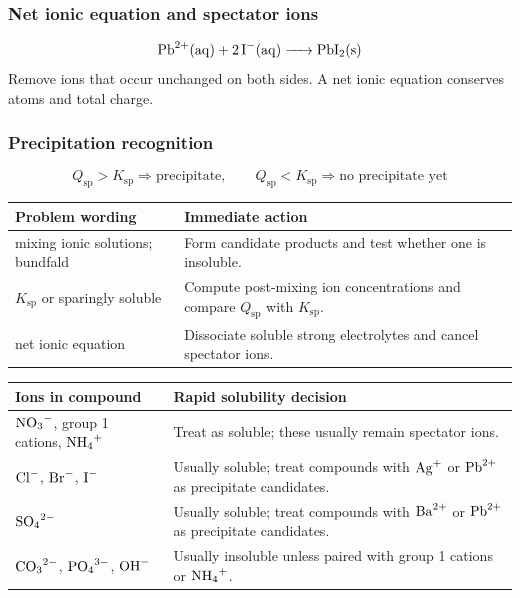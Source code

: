 \subsubsection{Net ionic equation and spectator ions}
\begin{equation}\label{eq:aqueous:net-ionic-example}
\ce{Pb^2+(aq) + 2I-(aq) -> PbI2(s)}
\end{equation}
Remove ions that occur unchanged on both sides. A net ionic equation conserves atoms and total charge.

\subsubsection{Precipitation recognition}
\begin{equation}\label{eq:aqueous:precipitation-test}
Q_{\mathrm{sp}}>K_{\mathrm{sp}}\Rightarrow\text{precipitate}, \qquad
Q_{\mathrm{sp}}<K_{\mathrm{sp}}\Rightarrow\text{no precipitate yet}
\end{equation}
\begin{tabular}{@{}>{\raggedright\arraybackslash}p{4.2cm}>{\raggedright\arraybackslash}p{8.0cm}@{}}
\toprule
Problem wording & Immediate action\\
\midrule
mixing ionic solutions; bundfald & Form candidate products and test whether one is insoluble.\\
\(K_{\mathrm{sp}}\) or sparingly soluble & Compute post-mixing ion concentrations and compare \(Q_{\mathrm{sp}}\) with \(K_{\mathrm{sp}}\).\\
net ionic equation & Dissociate soluble strong electrolytes and cancel spectator ions.\\
\bottomrule
\end{tabular}

\begin{tabular}{@{}>{\raggedright\arraybackslash}p{4.2cm}>{\raggedright\arraybackslash}p{8.0cm}@{}}
\toprule
Ions in compound & Rapid solubility decision\\
\midrule
\(\ce{NO3-}\), group 1 cations, \(\ce{NH4+}\) & Treat as soluble; these usually remain spectator ions.\\
\(\ce{Cl-}\), \(\ce{Br-}\), \(\ce{I-}\) & Usually soluble; treat compounds with \(\ce{Ag+}\) or \(\ce{Pb^2+}\) as precipitate candidates.\\
\(\ce{SO4^2-}\) & Usually soluble; treat compounds with \(\ce{Ba^2+}\) or \(\ce{Pb^2+}\) as precipitate candidates.\\
\(\ce{CO3^2-}\), \(\ce{PO4^3-}\), \(\ce{OH-}\) & Usually insoluble unless paired with group 1 cations or \(\ce{NH4+}\).\\
\bottomrule
\end{tabular}

